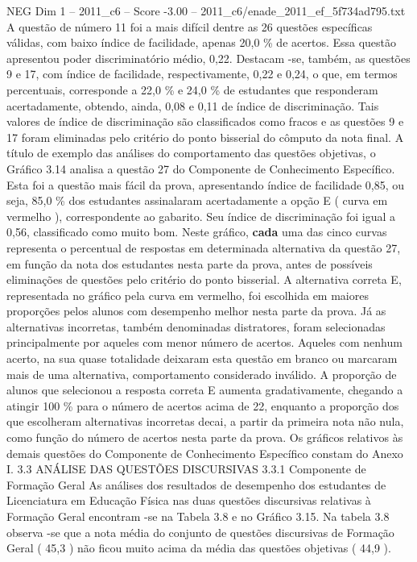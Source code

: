 \begin{textsample}{NEG Dim 1 – 2011\_c6 – Score -3.00 – 2011\_c6/enade\_2011\_ef\_5f734ad795.txt}
A questão de número 11 foi a mais difícil dentre as 26 questões específicas válidas, com baixo índice de facilidade, apenas 20,0 \% de acertos.
Essa questão apresentou poder discriminatório médio, 0,22.
Destacam -se, também, as questões 9 e 17, com índice de facilidade, respectivamente, 0,22 e 0,24, o que, em termos percentuais, corresponde a 22,0 \% e 24,0 \% de estudantes que responderam acertadamente, obtendo, ainda, 0,08 e 0,11 de índice de discriminação.
Tais valores de índice de discriminação são classificados como fracos e as questões 9 e 17 foram eliminadas pelo critério do ponto bisserial do cômputo da nota final.
A título de exemplo das análises do comportamento das questões objetivas, o Gráfico 3.14 analisa a questão 27 do Componente de Conhecimento Específico.
Esta foi a questão mais fácil da prova, apresentando índice de facilidade 0,85, ou seja, 85,0 \% dos estudantes assinalaram acertadamente a opção E ( curva em vermelho ), correspondente ao gabarito.
Seu índice de discriminação foi igual a 0,56, classificado como muito bom.
Neste gráfico, \textbf{cada} uma das cinco curvas representa o percentual de respostas em determinada alternativa da questão 27, em função da nota dos estudantes nesta parte da prova, antes de possíveis eliminações de questões pelo critério do ponto bisserial.
A alternativa correta E, representada no gráfico pela curva em vermelho, foi escolhida em maiores proporções pelos alunos com desempenho melhor nesta parte da prova.
Já as alternativas incorretas, também denominadas distratores, foram selecionadas principalmente por aqueles com menor número de acertos.
Aqueles com nenhum acerto, na sua quase totalidade deixaram esta questão em branco ou marcaram mais de uma alternativa, comportamento considerado inválido.
A proporção de alunos que selecionou a resposta correta E aumenta gradativamente, chegando a atingir 100 \% para o número de acertos acima de 22, enquanto a proporção dos que escolheram alternativas incorretas decai, a partir da primeira nota não nula, como função do número de acertos nesta parte da prova.
Os gráficos relativos às demais questões do Componente de Conhecimento Específico constam do Anexo I. 3.3 ANÁLISE DAS QUESTÕES DISCURSIVAS 3.3.1 Componente de Formação Geral As análises dos resultados de desempenho dos estudantes de Licenciatura em Educação Física nas duas questões discursivas relativas à Formação Geral encontram -se na Tabela 3.8 e no Gráfico 3.15.
Na tabela 3.8 observa -se que a nota média do conjunto de questões discursivas de Formação Geral ( 45,3 ) não ficou muito acima da média das questões objetivas ( 44,9 ).

\end{textsample}
